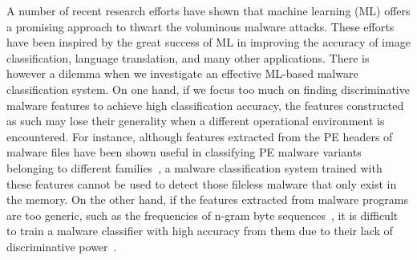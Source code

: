A number of recent research efforts\cite{NgramMalwareDetect, QgramMalwareDetect, McBoost, GraphMalwareDetect, YanDataset, AutoEncoderFeatureLearn, AutoEncoderMicrosoft, FunctionCallGraph, YuxinMalwareDnn,NovelFeatureFusion,StaticFeatures,PolySeqCls} have shown that machine learning (ML) offers a promising approach to thwart the voluminous malware attacks.
These efforts have been inspired by the great success of ML in improving the accuracy of image classification, language translation, and many other applications.
There is however a dilemma when we investigate an effective ML-based malware classification system.
On one hand, if we focus too much on finding discriminative malware features to achieve high classification accuracy, the features constructed as such may lose their generality when a different operational environment is encountered.
For instance, although features extracted from the PE headers of malware files have been shown useful in classifying PE malware variants belonging to different families~\cite{yan2013exploring},
a malware classification system trained with these features cannot be used to detect those fileless malware that only exist in the memory.
On the other hand, if the features extracted from malware programs are too generic, such as the frequencies of n-gram byte sequences~\cite{NgramMalwareDetect},
it is difficult to train a malware classifier with high accuracy from them due to their lack of discriminative power~\cite{yan2013exploring}.

